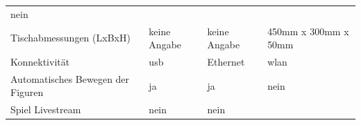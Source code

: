 \begin{longtable}[]{@{}llll@{}}
\begin{minipage}[t]{0.16\columnwidth}
nein\strut
\end{minipage}\tabularnewline
\begin{minipage}[t]{0.24\columnwidth}\raggedright
Tischabmessungen (LxBxH)\strut
\end{minipage} & \begin{minipage}[t]{0.24\columnwidth}\raggedright
keine Angabe\strut
\end{minipage} & \begin{minipage}[t]{0.25\columnwidth}\raggedright
keine Angabe\strut
\end{minipage} & \begin{minipage}[t]{0.16\columnwidth}\raggedright
450mm x 300mm x 50mm\strut
\end{minipage}\tabularnewline
\begin{minipage}[t]{0.24\columnwidth}\raggedright
Konnektivität\strut
\end{minipage} & \begin{minipage}[t]{0.24\columnwidth}\raggedright
\gls{usb}\strut
\end{minipage} & \begin{minipage}[t]{0.25\columnwidth}\raggedright
Ethernet\strut
\end{minipage} & \begin{minipage}[t]{0.16\columnwidth}\raggedright
\gls{wlan}\strut
\end{minipage}\tabularnewline
\begin{minipage}[t]{0.24\columnwidth}\raggedright
Automatisches Bewegen der Figuren\strut
\end{minipage} & \begin{minipage}[t]{0.24\columnwidth}\raggedright
ja\strut
\end{minipage} & \begin{minipage}[t]{0.25\columnwidth}\raggedright
ja\strut
\end{minipage} & \begin{minipage}[t]{0.16\columnwidth}\raggedright
nein\strut
\end{minipage}\tabularnewline
\begin{minipage}[t]{0.24\columnwidth}\raggedright
Spiel Livestream\strut
\end{minipage} & \begin{minipage}[t]{0.24\columnwidth}\raggedright
nein\strut
\end{minipage} & \begin{minipage}[t]{0.25\columnwidth}\raggedright
nein\strut
\end{minipage} & \begin{minipage}[t]{0.16\columnwidth}\raggedright

\end{minipage}
\end{longtable}
